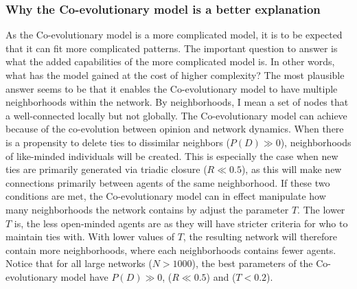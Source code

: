 \documentclass{article}
\begin{document}
\subsubsection{Why the Co-evolutionary model is a better explanation}
As the Co-evolutionary model is a more complicated model, it is to be expected that it can fit more complicated patterns. The important question to answer is what the added capabilities of the more complicated model is. In other words, what has the model gained at the cost of higher complexity?
The most plausible answer seems to be that it enables the Co-evolutionary model to have multiple neighborhoods within the network. By neighborhoods, I mean a set of nodes that a well-connected locally but not globally. The Co-evolutionary model can achieve because of the co-evolution between opinion and network dynamics. 
When there is a propensity to delete ties to dissimilar neighbors ($P(D) \gg 0$), neighborhoods of like-minded individuals will be created. This is especially the case when new ties are primarily generated via triadic closure ($R \ll 0.5$), as this will make new connections primarily between agents of the same neighborhood. 
If these two conditions are met, the Co-evolutionary model can in effect manipulate how many neighborhoods the network contains by adjust the parameter $T$. 
The lower $T$ is, the less open-minded agents are as they will have stricter criteria for who to maintain ties with. With lower values of $T$, the resulting network will therefore contain more neighborhoods, where each neighborhoods contains fewer agents. Notice that for all large networks ($N > 1000$), the best parameters of the Co-evolutionary model have $P(D) \gg 0$, ($R \ll 0.5$) and ($T < 0.2$).
\end{document}
